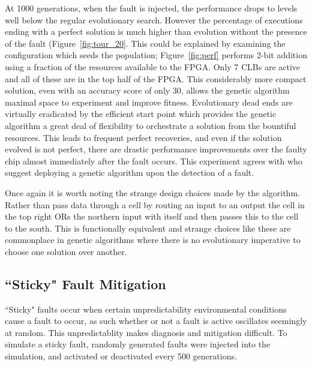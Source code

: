 At 1000 generations, when the fault is injected, the performance drops to levels
well below the regular evolutionary search. However the percentage of executions
ending with a perfect solution is much higher than evolution without the presence
of the fault (Figure~\ref{fig:tour_20}. This could be explained by examining the configuration which seeds
the population; Figure~\ref{fig:perf} performs 2-bit addition using a fraction of the
resources available to the FPGA. Only 7 CLBs are active and all of these are in the top
half of the FPGA. This considerably more compact solution, even with an accuracy score
of only 30, allows the genetic algorithm maximal space to experiment and improve fitness.
Evolutionary dead ends are virtually
eradicated by the efficient start point which provides the genetic algorithm a great
deal of flexibility to orchestrate a solution from the bountiful resources.
This leads to frequent perfect recoveries, and even if the solution evolved is not perfect,
there are drastic performance improvements over the faulty chip almost immediately after
the fault occurs. This experiment agrees with \cite{10.1007/3-540-61093-6_6} who suggest
deploying a genetic algorithm upon the detection of a fault.

Once again it is worth noting the strange design choices made by the algorithm.
Rather than pass data through a cell by routing an input to an output the cell
in the top right ORs the northern input with itself and then passes this to the cell
to the south. This is functionally equivalent and strange choices like these are
commonplace in genetic algorithms where
there is no evolutionary imperative to choose one solution over another.

\subsection{``Sticky" Fault Mitigation}
``Sticky" faults occur when certain unpredictability environmental conditions cause
a fault to occur, as such whether or not a fault is active oscillates seemingly at
random. This unpredictablity makes diagnosis and mitigation difficult.
To simulate a sticky fault, randomly generated faults were injected into the simulation,
and activated
or deactivated every 500 generations.

